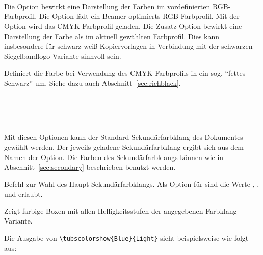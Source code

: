\begin{Declaration}
  \\
  \\
  \\[1ex]
\end{Declaration}

Die Option  bewirkt eine Darstellung der Farben im vordefinierten
RGB-Farbprofil.
Die Option  lädt ein Beamer-optimierts RGB-Farbprofil.
Mit der Option  wird das CMYK-Farbprofil geladen.
Die Zusatz-Option  bewirkt eine Darstellung der Farbe
 als  im aktuell gewählten Farbprofil.
Dies kann insbesondere für schwarz-weiß Kopiervorlagen in Verbindung
mit der schwarzen Siegelbandlogo-Variante sinnvoll sein.


\begin{Declaration}
\end{Declaration}

Definiert die Farbe  bei Verwendung des CMYK-Farbprofils
in ein sog. "`fettes Schwarz"' um. Siehe dazu auch Abschnitt~\ref{sec:richblack}.

\begin{Declaration}
  \\
  \\
  \\
\end{Declaration}

Mit diesen Optionen kann der Standard-Sekundärfarbklang des Dokumentes gewählt
werden. Der jeweils geladene Sekundärfarbklang ergibt sich aus dem Namen
der Option.
Die Farben des Sekundärfarbklangs können wie in Abschnitt~\ref{sec:secondary}
beschrieben benutzt werden.

\begin{Declaration}
\end{Declaration}

Befehl zur Wahl des Haupt-Sekundärfarbklangs. Als Option für 
sind die Werte , ,  und 
erlaubt.

\begin{Declaration}
\end{Declaration}

Zeigt farbige Boxen mit allen Helligkeitsstufen der angegebenen Farbklang-Variante.
\begin{example}
 Die Ausgabe von \lstinline!\tubscolorshow{Blue}{Light}! sieht beispielsweise
 wie folgt aus:\\
\end{example}

\fussy
